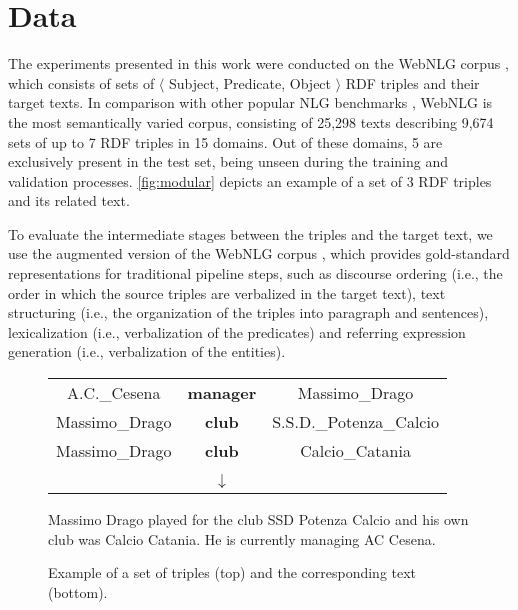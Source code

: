 \documentclass[11pt,a4paper]{article}
\begin{document}
\section{Data}





The experiments presented in this work were conducted on the WebNLG corpus \cite{claire2017,claire2017b}, which consists of sets of $\langle$ Subject, Predicate, Object $\rangle$ RDF triples and their target texts. In comparison with other popular NLG benchmarks \cite{belz2011,novikova2017b,mille2018}, WebNLG is the most semantically varied corpus, consisting of 25,298 texts describing 9,674 sets of up to 7 RDF triples in 15 domains. Out of these domains, 5 are exclusively present in the test set, being unseen during the training and validation processes. \autoref{fig:modular} depicts an example of a set of 3 RDF triples and its related text.

To evaluate the intermediate stages between the triples and the target text, we use the augmented version of the WebNLG corpus \citep{ferreira2018b}, which provides gold-standard representations for traditional pipeline steps, such as discourse ordering (i.e., the order in which the source triples are verbalized in the target text), text structuring (i.e., the organization of the triples into paragraph and sentences), lexicalization (i.e., verbalization of the predicates) and referring expression generation (i.e., verbalization of the entities).


\begin{figure}
\footnotesize{
\begin{center}
\vspace{0.1cm}

\begin{tabular}{c c c}
A.C.\_Cesena   & \textbf{manager} & Massimo\_Drago \\
Massimo\_Drago & \textbf{club} & S.S.D.\_Potenza\_Calcio \\
Massimo\_Drago & \textbf{club} & Calcio\_Catania  \\
&  &   \\
 & $\downarrow$ &   \\
\end{tabular}
\end{center}
\vspace{0.1cm}

Massimo Drago played for the club SSD Potenza Calcio and his own club was Calcio Catania. He is currently managing AC Cesena.
\vspace{0.1cm}
\caption{Example of a set of triples (top) and the corresponding text (bottom).}
\label{fig:modular}
}
\end{figure}
\end{document}
